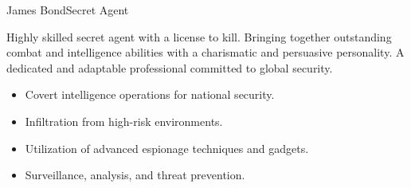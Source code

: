 \documentclass{article}
\begin{document}
\begin{cv}[avatar]{James Bond}{Secret Agent}


Highly skilled secret agent with a license to kill. 
Bringing together outstanding combat and intelligence abilities with a charismatic and persuasive personality. 
A dedicated and adaptable professional committed to global security.

\begin{cvevent}[1962][present]
    \begin{itemize}
        \item Covert intelligence operations for national security.
        \item Infiltration from high-risk environments.
        \item Utilization of advanced espionage techniques and gadgets.
        \item Surveillance, analysis, and threat prevention.
    \end{itemize}
\end{cvevent}



\end{cv}
\end{document}
